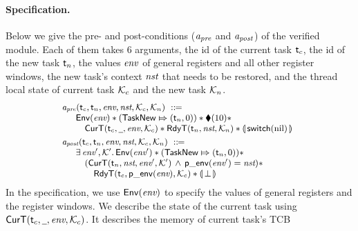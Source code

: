 \paragraph{\textbf{Specification.}}
Below we give the pre- and post-conditions
($\textit{a}_\textit{pre}$ and $\textit{a}_\textit{post}$) of the verified module.
Each of them takes 6 arguments, 
the id of the current task $\textsf{t}_c$, the id of the new 
task $\textsf{t}_n$, the values $\textit{env}$ of general registers and all
other register windows, the new task's context $\textit{nst}$
that needs to be restored, and the thread local state 
of current task $\mathcal{K}_c$ and the new task 
$\mathcal{K}_n$.  
\[
    \small
    \begin{array}{l}
        \textit{a}_\textit{pre}(\textsf{t}_c, \textsf{t}_n, \textit{env}, \textit{nst}, \mathcal{K}_c, \mathcal{K}_n)
        \ ::\!\!{=} \\
        \quad
        \begin{array}{l}
            \mathsf{Env}({\textit{env}}) *
            ({\mathsf{TaskNew}}\Mapsto{(\textsf{t}_n, 0)}) * 
            \blacklozenge({10}) * \\
            \quad
            \textsf{CurT}({\textsf{t}_c}, {\underline{\ \,}}, {\textit{env}}, {\mathcal{K}_c}) * 
            \textsf{RdyT}({\textsf{t}_n}, {\textit{nst}}, {\mathcal{K}_n}) * 
            \llparenthesis {\, \mathsf{switch}(\text{nil}) \,} \rrparenthesis
        \end{array}
        \\
        \\[-8pt]
        \textit{a}_\textit{post}(\textsf{t}_c, \textsf{t}_n, \textit{env}, \textit{nst}, \mathcal{K}_c, \mathcal{K}_n)
        \ ::\!\!{=} \\ 
        \quad
        \begin{array}{l}
            \exists \, \textit{env}', \mathcal{K}'. \, \mathsf{Env}({\textit{env}'}) 
            * ({\mathsf{TaskNew}}\Mapsto{(\textsf{t}_n, 0)}) 
            * \
            \\
            \quad
            (\textsf{CurT}({\textsf{t}_n}, {\textit{nst}}, {\textit{env}'}, {\mathcal{K}'})
            \,\land\,\mathsf{p\_env}({\textit{env}'}) = \textit{nst}) * 
            \\
            \qquad
            \textsf{RdyT}({\textsf{t}_c}, {\mathsf{p\_env}({\textit{env}})}, {\mathcal{K}_c}) * 
            \llparenthesis {\, \perp\,} \rrparenthesis
        \end{array}
    \end{array}
\]
In the specification,
we use $\mathsf{Env}({\textit{env}})$ to specify the values of
general registers and the register windows.
We describe the state
of the current task 
using $\textsf{CurT}({\textsf{t}_c}, {\underline{\ \,}}, {\textit{env}}, {\mathcal{K}_c})$. 
It describes the memory of current task's TCB 
